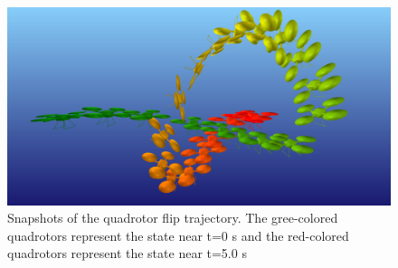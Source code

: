 \documentclass[letterpaper, 10 pt, conference]{ieeeconf}  %
\begin{document}
        \begin{figure}[ht]
            \centering
            \includegraphics[width=\columnwidth]{figures/quadflip.png}
            \caption{Snapshots of the quadrotor flip trajectory. The
                gree-colored quadrotors represent the state near t=0 s and the
                red-colored quadrotors represent the state near t=5.0 s
            }
            \label{fig:quad_flip}
        \end{figure}    
\end{document}

